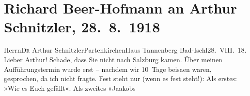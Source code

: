 

         
         \renewcommand{\erwaehntePersonen}{Personen: Richard Beer-Hofmann, Olga Schnitzler, Elisabeth Steinrück, Albert Steinrück}
         \renewcommand{\erwaehnteOrte}{Orte: Bad Ischl, Garmisch-Partenkirchen, Haus Tannenberg, Partenkirchen, Salzburg, Wien}
         \renewcommand{\erwaehnteWerke}{Werke: Jaákobs Traum. Ein Vorspiel, Wie es euch gefällt}
               \section[Richard Beer-Hofmann an Arthur Schnitzler, 28. 8. 1918]{ Richard Beer-Hofmann an Arthur Schnitzler, 28. 8. 1918}\nopagebreak{}\rehead{ }\begin{ledgroupsized}[t]{13cm}\normalsize\beginnumbering{} \toendnotes[C]{\smallbreak\pagebreak[2]} 
\toendnotes[C]{\smallbreak}\pstart{}{\pb}Herrn\pend{}\pstart{}D\textsc{r} Arthur Schnitzler\pend{}\pstart{}Partenkirchen\pend{}\pstart{}Haus Tannenberg\pend{}{\bigskip}\pstart
           \raggedleft{}{\pb}Bad-Ischl28. VIII. 18.\pend
           \pstart
           Lieber Arthur! Schade, dass Sie nicht nach Salzburg kamen. Über meinen Aufführungstermin wurde erst –
               nachdem wir 10 Tage beisa{\geminationm}en waren, gesprochen, da ich
               nicht fragte. Fest steht  nur \introOben{}(wenn es fest steht!\introOben{}): Als erstes: »Wie es
                  Euch gefällt«. Als zweites »Jaakobs

\end{ledgroupsized}
